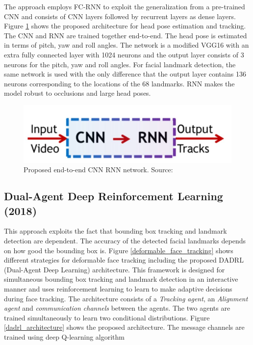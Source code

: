 \documentclass{llncs}
\begin{document}
The approach employs FC-RNN to exploit the generalization from a pre-trained CNN and consists of CNN layers followed by recurrent layers as dense layers. Figure \ref{cnn_rnn} shows the proposed architecture for head pose estimation and tracking. The CNN and RNN are trained together end-to-end. The head pose is estimated in terms of pitch, yaw and roll angles. The network is a modified VGG16 with an extra fully connected layer with 1024 neurons and the output layer consists of 3 neurons for the pitch, yaw and roll angles. For facial landmark detection, the same network is used with the only difference that the output layer contains 136 neurons corresponding to the locations of the 68 landmarks. RNN makes the model robust to occlusions and large head poses.\\

\begin{figure}
\centering
\includegraphics[scale=0.5]{Media/cnn_rnn}
\caption{Proposed end-to-end CNN RNN network. Source:\cite{dynamic_facial_analysis}}
\label{cnn_rnn}
\end{figure}




\subsection{Dual-Agent Deep Reinforcement Learning (2018) \cite{dadrl}}

This approach exploits the fact that bounding box tracking and landmark detection are dependent. The accuracy of the detected facial landmarks depends on how good the bounding box is.
Figure \ref{deformable_face_tracking} shows different strategies for deformable face tracking including the proposed DADRL (Dual-Agent Deep Learning) architecture. This framework is designed for simultaneous bounding box tracking and landmark detection in an interactive manner and uses reinforcement learning to learn to make adaptive decisions during face tracking. The architecture consists of a \textit{Tracking agent}, an \textit{Alignment agent} and \textit{communication channels} between the agents. The two agents are trained simultaneously to learn two conditional distributions. Figure \ref{dadrl_architecture} shows the proposed architecture. The message channels are trained using deep Q-learning algorithm\\
\end{document}

